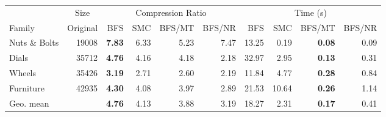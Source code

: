 \begin{tabular}{l r rrrr rrrr}
\toprule
& \multicolumn{1}{c}{Size} & \multicolumn{4}{c}{Compression Ratio} & \multicolumn{4}{c}{Time (s)} \\
\cmidrule(lr){2-2} \cmidrule(lr){3-6} \cmidrule(lr){7-10}
Family & Original & BFS & SMC & BFS/MT & BFS/NR & BFS & SMC & BFS/MT & BFS/NR \\
\midrule
Nuts \& Bolts & 19008 & \textbf{7.83} & 6.33 & 5.23 & 7.47 & 13.25 & 0.19 & \textbf{0.08} & 0.09 \\
Dials & 35712 & \textbf{4.76} & 4.16 & 4.18 & 2.18 & 32.97 & 2.95 & \textbf{0.13} & 0.31 \\
Wheels & 35426 & \textbf{3.19} & 2.71 & 2.60 & 2.19 & 11.84 & 4.77 & \textbf{0.28} & 0.84 \\
Furniture & 42935 & \textbf{4.30} & 4.08 & 3.97 & 2.89 & 21.53 & 10.64 & \textbf{0.26} & 1.14 \\
\midrule
Geo. mean &  & \textbf{4.76} & 4.13 & 3.88 & 3.19 & 18.27 & 2.31 & \textbf{0.17} & 0.41 \\
\bottomrule
\end{tabular}
